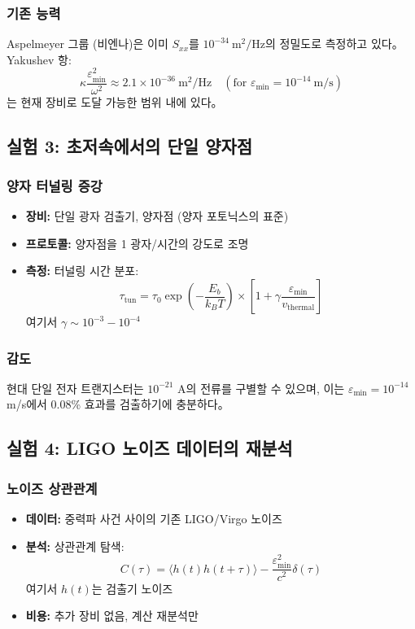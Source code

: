\documentclass[11pt,a4paper]{article}
\begin{document}
\subsubsection{기존 능력}

Aspelmeyer 그룹 (비엔나)은 이미 $S_{xx}$를 $10^{-34}\ \text{m}^2/\text{Hz}$의 정밀도로 측정하고 있다。 Yakushev 항:
\[
\kappa\frac{\varepsilon_{\min}^2}{\omega^2} \approx 2.1 \times 10^{-36}\ \text{m}^2/\text{Hz} \quad (\text{for } \varepsilon_{\min} = 10^{-14}\ \text{m/s})
\]
는 현재 장비로 도달 가능한 범위 내에 있다。

\subsection{실험 3: 초저속에서의 단일 양자점}

\subsubsection{양자 터널링 증강}
\begin{itemize}
\item \textbf{장비:} 단일 광자 검출기, 양자점 (양자 포토닉스의 표준)
\item \textbf{프로토콜:} 양자점을 1 광자/시간의 강도로 조명
\item \textbf{측정:} 터널링 시간 분포:
\[
\tau_{\text{tun}} = \tau_0 \exp\left(-\frac{E_b}{k_B T}\right) \times \left[1 + \gamma\frac{\varepsilon_{\min}}{v_{\text{thermal}}}\right]
\]
여기서 $\gamma \sim 10^{-3} - 10^{-4}$
\end{itemize}

\subsubsection{감도}

현대 단일 전자 트랜지스터는 $10^{-21}$ A의 전류를 구별할 수 있으며, 이는 $\varepsilon_{\min} = 10^{-14}$ m/s에서 0.08\% 효과를 검출하기에 충분하다。

\subsection{실험 4: LIGO 노이즈 데이터의 재분석}

\subsubsection{노이즈 상관관계}
\begin{itemize}
\item \textbf{데이터:} 중력파 사건 사이의 기존 LIGO/Virgo 노이즈
\item \textbf{분석:} 상관관계 탐색:
\[
C(\tau) = \langle h(t)h(t+\tau)\rangle - \frac{\varepsilon_{\min}^2}{c^2}\delta(\tau)
\]
여기서 $h(t)$는 검출기 노이즈
\item \textbf{비용:} 추가 장비 없음, 계산 재분석만
\end{itemize}
\end{document}
